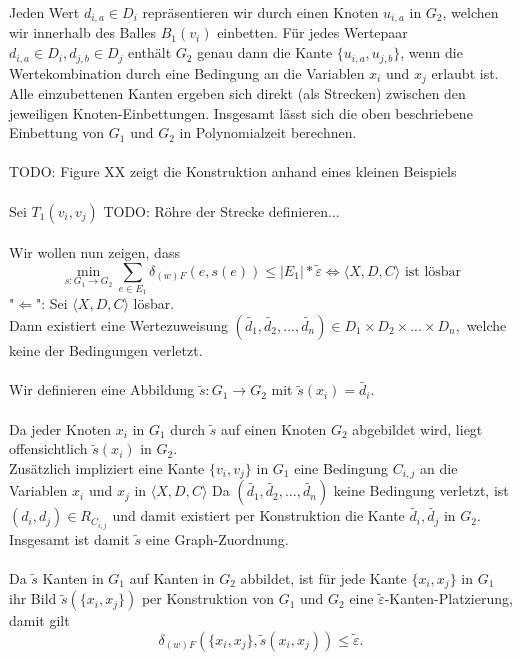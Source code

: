\documentclass[a4paper, 12pt, twoside]{article}
\theoremstyle{Format1} %
\begin{document}
Jeden Wert $d_{i,a} \in D_i$ repräsentieren wir durch einen Knoten $u_{i,a}$ in $G_2$, welchen wir innerhalb des Balles $B_1(v_i)$ einbetten.
Für jedes Wertepaar $d_{i,a} \in D_i, d_{j,b} \in D_j$ enthält $G_2$ genau dann die Kante $\{u_{i,a},u_{j,b}\}$, wenn die Wertekombination
durch eine Bedingung an die Variablen $x_i$ und $x_j$ erlaubt ist.
\\
Alle einzubettenen Kanten ergeben sich direkt (als Strecken) zwischen den jeweiligen Knoten-Einbettungen.
Insgesamt lässt sich die oben beschriebene Einbettung von $G_1$ und $G_2$ in Polynomialzeit berechnen.
\\
\\
TODO: Figure XX zeigt die Konstruktion anhand eines kleinen Beispiels
\\
\\
Sei $T_1(v_i,v_j)$  TODO: Röhre der Strecke definieren...
\\
\\
Wir wollen nun zeigen, dass
$$ \min_{s: G_1 \to G_2} \sum_{e \in E_1} \delta_{(w)F}(e, s(e)) \leq |E_1| * \tilde{\varepsilon} \iff \langle X,D,C \rangle \text{ ist lösbar}$$
"$\Leftarrow$":
Sei $\langle X,D,C \rangle$ lösbar.
\\
Dann existiert eine Wertezuweisung $(\tilde{d_1},\tilde{d_2},...,\tilde{d_n}) \in {D_1 \times D_2 \times ... \times D_n},$ welche keine der Bedingungen verletzt.
\\\\
Wir definieren eine Abbildung $\tilde{s}:G_1 \to G_2$ mit $\tilde{s}(x_i) = \tilde{d_i}$.
\\
\\
Da jeder Knoten $x_i$ in $G_1$ durch $\tilde{s}$ auf einen Knoten $G_2$ abgebildet wird, liegt offensichtlich $\tilde{s}(x_i)$ in $G_2$.
\\
Zusätzlich impliziert eine Kante $\{v_i, v_j\}$ in $G_1$ eine Bedingung $C_{i,j}$ an die Variablen $x_i$ und $x_j$ in $\langle X,D,C \rangle$
Da $(\tilde{d_1},\tilde{d_2},...,\tilde{d_n})$ keine Bedingung verletzt, ist $(d_i,d_j) \in R_{C_{i,j}}$ und damit existiert per Konstruktion
die Kante ${\tilde{d_i}, \tilde{d_j}}$ in $G_2$.
Insgesamt ist damit $\tilde{s}$ eine Graph-Zuordnung.
\\
\\
Da $\tilde{s}$ Kanten in $G_1$ auf Kanten in $G_2$ abbildet, ist für jede Kante $\{x_i, x_j\}$ in $G_1$ ihr Bild $\tilde{s}(\{x_i,x_j\})$ per Konstruktion
von $G_1$ und $G_2$ eine $\tilde{\varepsilon}$-Kanten-Platzierung, damit gilt
$$\delta_{(w)F}(\{x_i,x_j\}, \tilde{s}({x_i,x_j})) \leq \tilde{\varepsilon}.$$
\end{document}
